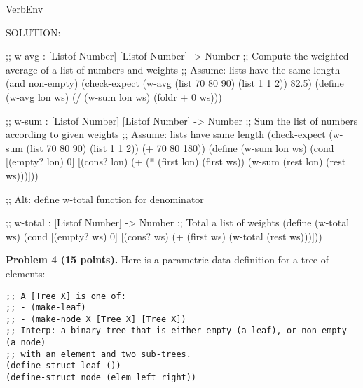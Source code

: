 \documentclass[12pt]{article}
\begin{document}
\begin{SaveVerbatim}{VerbEnv}


SOLUTION:

;; w-avg : [Listof Number] [Listof Number] -> Number
;; Compute the weighted average of a list of numbers and weights
;; Assume: lists have the same length (and non-empty)
(check-expect (w-avg (list 70 80 90) (list 1 1 2)) 82.5)
(define (w-avg lon ws)
  (/ (w-sum lon ws) 
     (foldr + 0 ws)))

;; w-sum : [Listof Number] [Listof Number] -> Number
;; Sum the list of numbers according to given weights
;; Assume: lists have same length
(check-expect (w-sum (list 70 80 90) (list 1 1 2)) (+ 70 80 180))
(define (w-sum lon ws)
  (cond [(empty? lon) 0]
        [(cons? lon)
         (+ (* (first lon) (first ws))
            (w-sum (rest lon) (rest ws)))]))

;; Alt: define w-total function for denominator

;; w-total : [Listof Number] -> Number
;; Total a list of weights
(define (w-total ws)
  (cond [(empty? ws) 0]
        [(cons? ws)
         (+ (first ws) 
            (w-total (rest ws)))]))
\end{SaveVerbatim}



\newpage 
\noindent
{\bf Problem 4 (15 points).}
%
Here is a parametric data definition for a tree of elements:
\begin{verbatim}
;; A [Tree X] is one of:
;; - (make-leaf)
;; - (make-node X [Tree X] [Tree X])
;; Interp: a binary tree that is either empty (a leaf), or non-empty (a node)
;; with an element and two sub-trees.
(define-struct leaf ())
(define-struct node (elem left right))
\end{verbatim}




\end{document}
